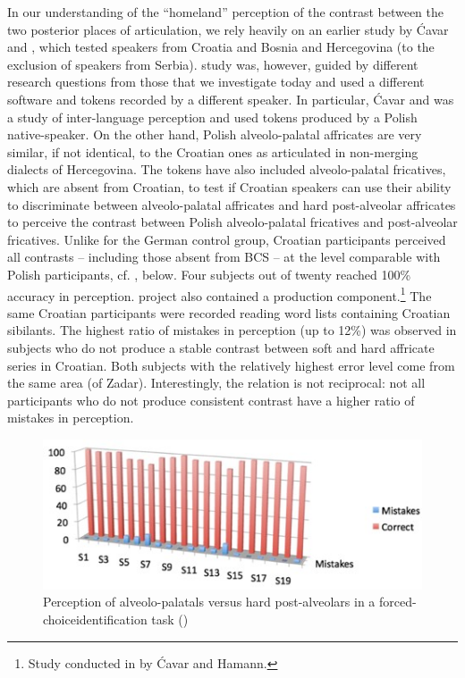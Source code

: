 \documentclass[output=paper,modfonts,nonflat,
]{langsci/langscibook}
\begin{document}
In our understanding of the “homeland” perception of the contrast between the two posterior places of articulation, we rely heavily on an earlier study by Ćavar and \citet{Hamann2011}{, which} test{ed} speakers from Croatia and Bosnia and Hercegovina (to the exclusion of speakers from Serbia). \citealt{The2011} study was, however, guided by different research questions from those that we investigate today{ and} used a different software and tokens recorded by a different speaker. In particular, Ćavar and \citet{Hamann2011} was a study of inter-language perception and used tokens produced by a Polish native-speaker. On the other hand, Polish alveolo-palatal affricates are very similar, if not identical, to the Croatian ones as articulated in non-merging dialects of Hercegovina. The tokens have also included alveolo-palatal fricatives, which are absent from Croatian, to test if Croatian speakers can use their ability to discriminate between alveolo-palatal affricates and hard post-alveolar affricates to perceive the contrast between Polish alveolo-palatal fricatives and post-alveolar fricatives. Unlike for the German control group, Croatian participants perceived all contrasts – including those absent from BCS – at the level comparable with Polish participants, cf. , below. Four subjects out of twenty reached 100\% accuracy in perception. \citealt{The2011} project also contained a production component.\footnote{Study conducted in \citeyear*{ĆavarHamann2008} by Ćavar and Hamann.} The same Croatian participants were recorded reading word lists containing Croatian sibilants. The highest ratio of mistakes in perception (up to 12\%) was observed in subjects who do not produce a stable contrast between soft and hard affricate series in Croatian. Both subjects with the relatively highest error level come from the same area (of Zadar). Interestingly, the relation is not reciprocal: not all participants who do not produce consistent contrast have a higher ratio of mistakes in perception.

\begin{figure}
\includegraphics[height=.3\textheight]{figures/M_C_Figure 3.jpg}
\caption{\label{fig:mihajlovic:3} Perception of alveolo-palatals versus hard post-alveolars in a forced-choiceidentification task (\citealt{ĆavarHamann2008})}
\end{figure}
\end{document}
